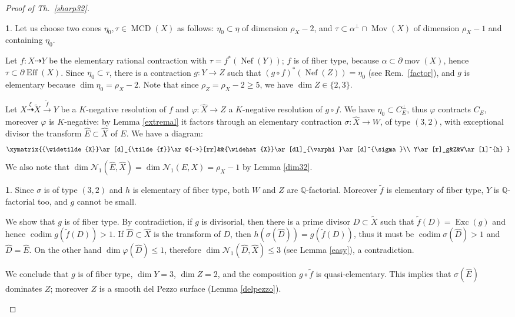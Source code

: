 \documentclass[a4paper,12pt]{amsart}
\theoremstyle{definition}
\newtheorem{prg}[thm]{}
\numberwithin{figure}{section}
\numberwithin{table}{section}
\newcommand{\ph}{\varphi}
\newcommand{\w}{\widetilde}
\newcommand{\wi}{\widehat}
\newcommand{\Q}{\mathbb{Q}}
\newcommand{\N}{\mathcal{N}_1}
\newcommand{\Exc}{\operatorname{Exc}}
\newcommand{\codim}{\operatorname{codim}}
\newcommand{\Eff}{\operatorname{Eff}}
\newcommand{\Nef}{\operatorname{Nef}}
\newcommand{\Mov}{\operatorname{Mov}}
\newcommand{\MCD}{\operatorname{MCD}}
\newcommand{\mov}{\operatorname{mov}}
\begin{document}
\begin{proof}[Proof of Th.~\ref{sharp32}]
\begin{prg}
Let us choose two cones $\eta_0,\tau\in\MCD(X)$ as follows: $\eta_0\subset\eta$ of dimension $\rho_X-2$, and $\tau\subset \alpha^{\perp}\cap\Mov(X)$  of dimension $\rho_X-1$ and containing $\eta_0$.

Let $f\colon X\dasharrow Y$ be the elementary rational contraction with $\tau=f^*(\Nef(Y))$; $f$ is of fiber type, because $\alpha\subset \partial\mov(X)$, hence
 $\tau\subset\partial\Eff(X)$.
Since $\eta_0\subset\tau$, there is a contraction $g\colon Y\to Z$ such that $(g\circ f)^*(\Nef(Z))=\eta_0$ (see Rem.~\ref{factor}), and $g$ is elementary because $\dim\eta_0=\rho_X-2$.   Note that since $\rho_Z=\rho_X-2\geq 5$, we have $\dim Z\in \{2,3\}$.

Let $X\stackrel{\xi}{\dasharrow}\w{X}\stackrel{\tilde{f}}{\to} Y$ be a $K$-negative resolution of $f$
and 
$\ph\colon\wi{X}\to Z$ a $K$-negative resolution of $g\circ f$.
We have $\eta_0\subset C_E^{\perp}$, thus $\ph$ contracts $C_E$, moreover 
$\ph$ is $K$-negative: by Lemma \ref{extremal} it factors through an elementary contraction $\sigma\colon \wi{X}\to W$, of type $(3,2)$, with exceptional divisor the transform $\wi{E}\subset\wi{X}$ of $E$.
We have a diagram:
$$\xymatrix{{\w{X}}\ar[d]_{\tilde{f}}\ar@{-->}[rr]&&{\wi{X}}\ar[dl]_{\ph}\ar[d]^{\sigma}\\
  Y\ar[r]_g&Z&W\ar[l]^{h}
  }$$
We also note that $\dim\N(\wi{E},\wi{X})=\dim\N(E,X)=\rho_X-1$ by Lemma \ref{dim32}.
\end{prg}
\begin{prg}
 Since $\sigma$ is of type $(3,2)$ and $h$ is elementary of fiber type, both $W$ and $Z$ are $\Q$-factorial. Moreover $\tilde{f}$ is elementary of fiber type, $Y$ is $\Q$-factorial too, and $g$ cannot be small.

 We show that $g$ is of fiber type. By contradiction, if $g$ is divisorial, then there is a prime divisor $D\subset\w{X}$ such that $\tilde{f}(D)=\Exc(g)$ and hence $\codim g(\tilde{f}(D))>1$. If $\wi{D}\subset\wi{X}$ is the transform of $D$, then $h(\sigma(\wi{D}))=g(\tilde{f}(D))$, thus it must be $\codim \sigma(\wi{D})>1$ and $\wi{D}=\wi{E}$. On the other hand $\dim \ph(\wi{D})\leq 1$, therefore $\dim\N(\wi{D},\wi{X})\leq 3$ (see Lemma \ref{easy}), a contradiction.

 We conclude that $g$ is of fiber type, $\dim Y=3$, $\dim Z=2$, and the composition $g\circ \tilde{f}$ is quasi-elementary. This implies that $\sigma(\wi{E})$ dominates $Z$; moreover $Z$ is a smooth del Pezzo surface (Lemma \ref{delpezzo}).


\end{prg}
\end{proof}
\end{document}
